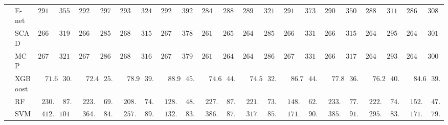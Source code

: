 \begin{tabular}{p{0.2cm}p{1cm}|p{0.6cm}p{0.6cm}|p{0.6cm}p{0.6cm}p{0.6cm}p{0.6cm}p{0.6cm}p{0.6cm}|p{0.6cm}p{0.6cm}p{0.6cm}p{0.6cm}p{0.6cm}p{0.6cm}|p{0.6cm}p{0.6cm}p{0.6cm}p{0.6cm}p{0.6cm}p{0.6cm}}
 & E-net  & $2910.20$ & $355.59$ & $2920.01$ & $297.80$ & $2933.67$ & $324.17$ & $2920.77$ & $392.48$ & $2840.37$ & $288.24$ & $2896.64$ & $321.23$ & $2913.46$ & $373.45$ & $2903.22$ & $350.73$ & $2889.01$ & $311.64$ & $2869.83$ & $308.88$ \\
 & SCAD  & $2669.74$ & $319.97$ & $2669.98$ & $285.50$ & $2683.54$ & $315.75$ & $2674.54$ & $378.27$ & $2613.28$ & $265.59$ & $2641.88$ & $285.33$ & $2669.37$ & $331.78$ & $2662.47$ & $315.87$ & $2642.64$ & $295.73$ & $2649.47$ & $301.39$ \\
 & MCP  & $2670.54$ & $321.23$ & $2670.15$ & $286.41$ & $2684.56$ & $316.55$ & $2675.12$ & $379.17$ & $2613.90$ & $264.16$ & $2643.99$ & $286.19$ & $2671.26$ & $331.36$ & $2664.08$ & $317.07$ & $2646.06$ & $293.95$ & $2649.71$ & $300.31$ \\
 & XGBoost  & $\phantom{00}71.61$ & $\phantom{0}30.49$ & $\phantom{00}72.48$ & $\phantom{0}25.89$ & $\phantom{00}78.96$ & $\phantom{0}39.04$ & $\phantom{00}88.96$ & $\phantom{0}45.11$ & $\phantom{00}74.60$ & $\phantom{0}44.15$ & $\phantom{00}74.58$ & $\phantom{0}32.46$ & $\phantom{00}86.77$ & $\phantom{0}44.52$ & $\phantom{00}77.80$ & $\phantom{0}36.14$ & $\phantom{00}76.24$ & $\phantom{0}40.18$ & $\phantom{00}84.65$ & $\phantom{0}39.51$ \\
 & RF  & $\phantom{0}230.96$ & $\phantom{0}87.62$ & $\phantom{0}223.44$ & $\phantom{0}69.22$ & $\phantom{0}208.00$ & $\phantom{0}74.51$ & $\phantom{0}128.85$ & $\phantom{0}48.22$ & $\phantom{0}227.64$ & $\phantom{0}87.04$ & $\phantom{0}221.12$ & $\phantom{0}73.08$ & $\phantom{0}148.76$ & $\phantom{0}62.59$ & $\phantom{0}233.35$ & $\phantom{0}77.15$ & $\phantom{0}222.54$ & $\phantom{0}74.22$ & $\phantom{0}152.12$ & $\phantom{0}47.85$ \\
 & SVM  & $\phantom{0}412.21$ & $101.23$ & $\phantom{0}364.13$ & $\phantom{0}84.15$ & $\phantom{0}257.55$ & $\phantom{0}89.05$ & $\phantom{0}132.26$ & $\phantom{0}83.16$ & $\phantom{0}386.81$ & $\phantom{0}87.26$ & $\phantom{0}317.43$ & $\phantom{0}85.82$ & $\phantom{0}171.73$ & $\phantom{0}90.10$ & $\phantom{0}385.23$ & $\phantom{0}91.51$ & $\phantom{0}295.24$ & $\phantom{0}83.96$ & $\phantom{0}171.48$ & $\phantom{0}79.94$ \\
\hline 
\end{tabular}

